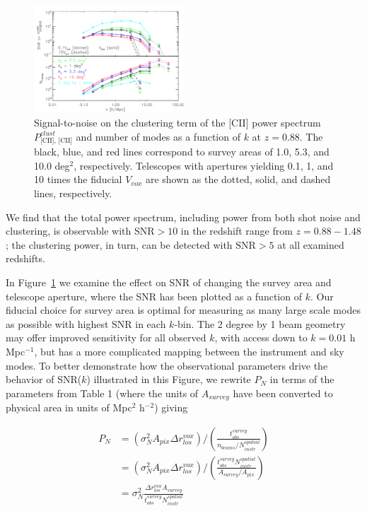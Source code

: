 \documentclass[iop]{emulateapj}
\begin{document}
\begin{figure}[b]
\centering
\includegraphics[width=0.5\textwidth]{snr_nmode_vs_k_starfire_ap2p5m_0p1vpix_10vpix_1sqdeg_5p3sqdeg_10sqdeg_ktnonzero}
\caption{Signal-to-noise on the clustering term of the [CII] power spectrum $P_{\textrm{[CII], [CII]}}^{clust}$ and number of modes as a function of $k$ at $z=0.88$. The black, blue, and red lines correspond to survey areas of 1.0, 5.3, and 10.0 deg$^2$, respectively. Telescopes with apertures yielding 0.1, 1, and 10 times the fiducial $V_{vox}$ are shown as the dotted, solid, and dashed lines, respectively.}
\label{fig:snr_nmode_k}
\end{figure}

We find that the total power spectrum, including power from both shot noise and clustering, is observable with SNR$>10$ in the redshift range from $z = 0.88-1.48$; the clustering power, in turn, can be detected with $\textrm{SNR}>5$ at all examined redshifts. 

In Figure~\ref{fig:snr_nmode_k} we examine the effect on SNR of changing the survey area and telescope aperture, where the SNR has been plotted as a function of $k$. Our fiducial choice for survey area is optimal for measuring as many large scale modes as possible with highest SNR in each $k$-bin. The 2 degree by 1 beam geometry may offer improved sensitivity for all observed $k$, with access down to $k=0.01$ h Mpc$^{-1}$, but has a more complicated mapping between the instrument and sky modes. To better demonstrate how the observational parameters drive the behavior of SNR($k$) illustrated in this Figure, we rewrite $P_N$ in terms of the parameters from Table 1 (where the units of $A_{survey}$ have been converted to physical area in units of Mpc$^{2}$ h$^{-2}$) giving 

\begin{equation}
\begin{split}
P_N& = \left(\sigma_N^2 A_{pix} \Delta r_{los}^{vox}\right) / \left({\frac{t_{obs}^{survey}}{n_{beams}/N_{instr}^{spatial}}}\right) \\
& = \left(\sigma_N^2 A_{pix}\Delta r_{los}^{vox}\right) /  \left(\frac{t_{obs}^{survey} N_{instr}^{spatial}}{A_{survey}/A_{pix}}\right)\\
& = \sigma_N^2 \frac{\Delta r_{los}^{vox} A_{survey}}{t_{obs}^{survey} N_{instr}^{spatial}}
\end{split}
\label{eq:pnoise}
\end{equation}
\end{document}
